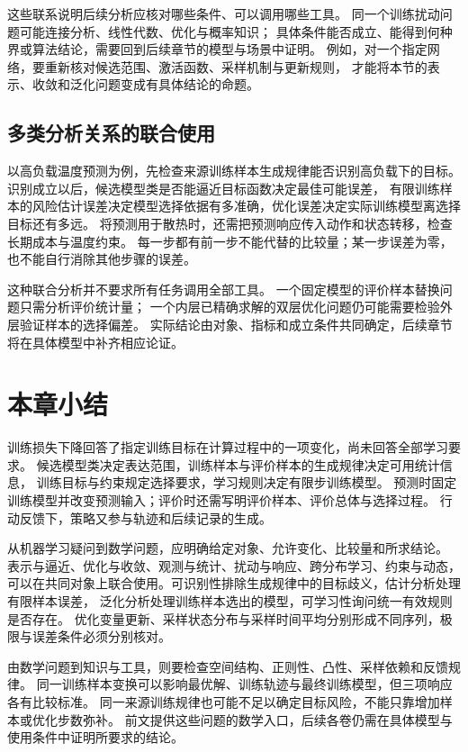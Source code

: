 这些联系说明后续分析应核对哪些条件、可以调用哪些工具。
同一个训练扰动问题可能连接分析、线性代数、优化与概率知识；
具体条件能否成立、能得到何种界或算法结论，需要回到后续章节的模型与场景中证明。
例如，对一个指定网络，要重新核对候选范围、激活函数、采样机制与更新规则，
才能将本节的表示、收敛和泛化问题变成有具体结论的命题。

\FloatBarrier
\subsection{多类分析关系的联合使用}
\label{sec:future-combined-analysis-relations}

以高负载温度预测为例，先检查来源训练样本生成规律能否识别高负载下的目标。
识别成立以后，候选模型类是否能逼近目标函数决定最佳可能误差，
有限训练样本的风险估计误差决定模型选择依据有多准确，优化误差决定实际训练模型离选择目标还有多远。
将预测用于散热时，还需把预测响应传入动作和状态转移，检查长期成本与温度约束。
每一步都有前一步不能代替的比较量；某一步误差为零，也不能自行消除其他步骤的误差。

这种联合分析并不要求所有任务调用全部工具。
一个固定模型的评价样本替换问题只需分析评价统计量；
一个内层已精确求解的双层优化问题仍可能需要检验外层验证样本的选择偏差。
实际结论由对象、指标和成立条件共同确定，后续章节将在具体模型中补齐相应论证。

\FloatBarrier
\section{本章小结}
\label{sec:future-summary}

训练损失下降回答了指定训练目标在计算过程中的一项变化，尚未回答全部学习要求。
候选模型类决定表达范围，训练样本与评价样本的生成规律决定可用统计信息，
训练目标与约束规定选择要求，学习规则决定有限步训练模型。
预测时固定训练模型并改变预测输入；评价时还需写明评价样本、评价总体与选择过程。
行动反馈下，策略又参与轨迹和后续记录的生成。

从机器学习疑问到数学问题，应明确给定对象、允许变化、比较量和所求结论。
表示与逼近、优化与收敛、观测与统计、扰动与响应、跨分布学习、约束与动态，
可以在共同对象上联合使用。可识别性排除生成规律中的目标歧义，估计分析处理有限样本误差，
泛化分析处理训练样本选出的模型，可学习性询问统一有效规则是否存在。
优化变量更新、采样状态分布与采样时间平均分别形成不同序列，极限与误差条件必须分别核对。

由数学问题到知识与工具，则要检查空间结构、正则性、凸性、采样依赖和反馈规律。
同一训练样本变换可以影响最优解、训练轨迹与最终训练模型，但三项响应各有比较标准。
同一来源训练规律也可能不足以确定目标风险，不能只靠增加样本或优化步数弥补。
前文提供这些问题的数学入口，后续各卷仍需在具体模型与使用条件中证明所要求的结论。

